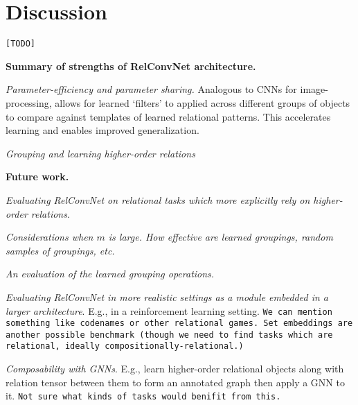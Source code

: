 
\section{Discussion}\label{sec:discussion}

\texttt{[TODO]}

\textbf{Summary of strengths of RelConvNet architecture.}

\textit{Parameter-efficiency and parameter sharing.} Analogous to CNNs for image-processing, allows for learned `filters' to applied across different groups of objects to compare against templates of learned relational patterns. This accelerates learning and enables improved generalization.

\textit{Grouping and learning higher-order relations}


\textbf{Future work.} 

\textit{Evaluating RelConvNet on relational tasks which more explicitly rely on higher-order relations}.

\textit{Considerations when $m$ is large. How effective are learned groupings, random samples of groupings, etc.}

\textit{An evaluation of the learned grouping operations.}

\textit{Evaluating RelConvNet in more realistic settings as a module embedded in a larger architecture}. E.g., in a reinforcement learning setting. \texttt{We can mention something like codenames or other relational games. Set embeddings are another possible benchmark (though we need to find tasks which are relational, ideally compositionally-relational.)}

\textit{Composability with GNNs}. E.g., learn higher-order relational objects along with relation tensor between them to form an annotated graph then apply a GNN to it. \texttt{Not sure what kinds of tasks would benifit from this.}
